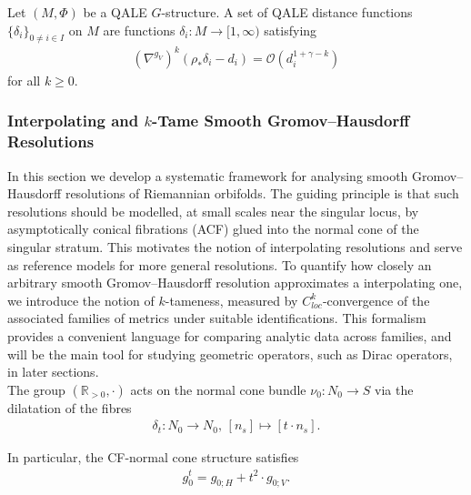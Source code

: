 \documentclass[psamsfonts]{amsart}
\theoremstyle{plain}
\theoremstyle{definition}{
\newtheorem{defi}{Definition}[section]
\newtheorem{ass}{Assumption}
\newtheorem*{nota}{Notation}}
\theoremstyle{remark}{
\newtheorem{rem}{Remark}
\newtheorem{ex}{Example}}
\theoremstyle{plain}{
\newtheorem{thm}{Theorem}[section]
\newtheorem{lem}{Lemma}[section]
\newtheorem{cor}{Corollary}[section]
\newtheorem{prop}{Proposition}[section]
\newtheorem{con}{Conjecture}[section]}
\begin{document}
\begin{defi}
Let $(M,\Phi)$ be a QALE $G$-structure. A set of QALE distance functions $\{\delta_i\}_{0\neq i\in I}$ on $M$ are functions $\delta_i\colon M\rightarrow [1,\infty)$ satisfying 
\begin{align*}
        (\nabla^{g_{V}})^k(\rho_*\delta_i-d_i)=\mathcal{O}(d_i^{1+\gamma-k})
\end{align*}
for all $k\geq 0$.
\end{defi}


\subsubsection{Interpolating and $k$-Tame Smooth Gromov--Hausdorff Resolutions}
\label{Interpolating and k-Tame smooth Gromov--Hausdorff Resolutions}

In this section we develop a systematic framework for analysing smooth Gromov--Hausdorff resolutions of Riemannian orbifolds. The guiding principle is that such resolutions should be modelled, at small scales near the singular locus, by asymptotically conical fibrations (ACF) glued into the normal cone of the singular stratum. This motivates the notion of interpolating resolutions and serve as reference models for more general resolutions. To quantify how closely an arbitrary smooth Gromov--Hausdorff resolution approximates a interpolating one, we introduce the notion of $k$-tameness, measured by $C^k_{loc}$-convergence of the associated families of metrics under suitable identifications. This formalism provides a convenient language for comparing analytic data across families, and will be the main tool for studying geometric operators, such as Dirac operators, in later sections.\\


The group $(\mathbb{R}_{>0},\cdot)$ acts on the normal cone bundle $\nu_0\colon N_0\rightarrow S$ via the dilatation of the fibres 
    \begin{align*}
        \delta_t\colon N_0\rightarrow N_0,\,[n_s]\mapsto [t\cdot n_s].
    \end{align*}

In particular, the CF-normal cone structure satisfies 
\begin{align*}
    g^t_0=g_{0;H}+t^2\cdot g_{0;V}.
\end{align*}
\end{document}
